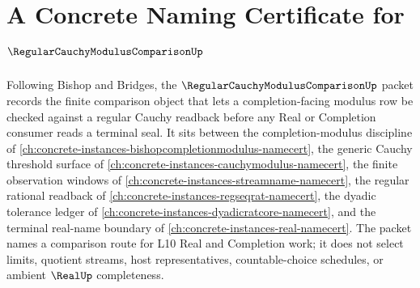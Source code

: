 \chapter{A Concrete Naming Certificate for $\RegularCauchyModulusComparisonUp$}
\label{ch:concrete-instances-regular-cauchy-modulus-comparison-namecert}

Following Bishop and Bridges, the $\RegularCauchyModulusComparisonUp$ packet records the finite comparison object that lets a completion-facing modulus row be checked against a regular Cauchy readback before any Real or Completion consumer reads a terminal seal. It sits between the completion-modulus discipline of \autoref{ch:concrete-instances-bishopcompletionmodulus-namecert}, the generic Cauchy threshold surface of \autoref{ch:concrete-instances-cauchymodulus-namecert}, the finite observation windows of \autoref{ch:concrete-instances-streamname-namecert}, the regular rational readback of \autoref{ch:concrete-instances-regseqrat-namecert}, the dyadic tolerance ledger of \autoref{ch:concrete-instances-dyadicratcore-namecert}, and the terminal real-name boundary of \autoref{ch:concrete-instances-real-namecert}. The packet names a comparison route for L10 Real and Completion work; it does not select limits, quotient streams, host representatives, countable-choice schedules, or ambient $\RealUp$ completeness.

